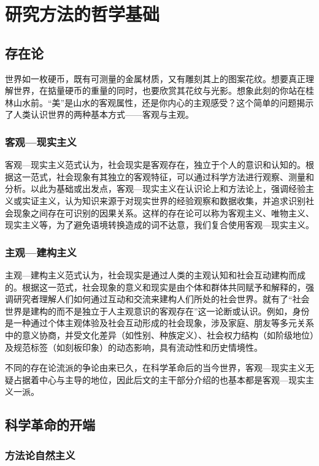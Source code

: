 \chapter{研究方法的哲学基础}
\section{存在论}
世界如一枚硬币，既有可测量的金属材质，又有雕刻其上的图案花纹。想要真正理解世界，在掂量硬币的重量的同时，也要欣赏其花纹与光影。想象此刻的你站在桂林山水前。“美”是山水的客观属性，还是你内心的主观感受？这个简单的问题揭示了人类认识世界的两种基本方式------客观与主观。\textsuperscript{\cite{1}}

\subsection{客观---现实主义}

客观---现实主义范式认为，社会现实是客观存在，独立于个人的意识和认知的。根据这一范式，社会现象有其独立的客观特征，可以通过科学方法进行观察、测量和分析。以此为基础或出发点，客观---现实主义在认识论上和方法论上，强调经验主义或实证主义，认为知识来源于对现实世界的经验观察和数据收集，并追求识别社会现象之间存在可识别的因果关系。这样的存在论可以称为客观主义、唯物主义、现实主义等，为了避免语境转换造成的词不达意，我们复合使用客观---现实主义。

\subsection{主观---建构主义}

主观---建构主义范式认为，社会现实是通过人类的主观认知和社会互动建构而成的。根据这一范式，社会现象的意义和现实是由个体和群体共同赋予和解释的，强调研究者理解人们如何通过互动和交流来建构人们所处的社会世界。就有了“社会世界是建构的而不是独立于人主观意识的客观存在”这一论断或认识。例如，身份是一种通过个体主观体验及社会互动形成的社会现象，涉及家庭、朋友等多元关系中的意义协商，并受文化差异（如性别、种族定义）、社会权力结构（如阶级地位）及规范标签（如刻板印象）的动态影响，具有流动性和历史情境性。

不同的存在论流派的争论由来已久，在科学革命后的当今世界，客观---现实主义无疑占据着中心与主导的地位，因此后文的主干部分介绍的也基本都是客观---现实主义一派。

\section{科学革命的开端}

\subsection{方法论自然主义}

